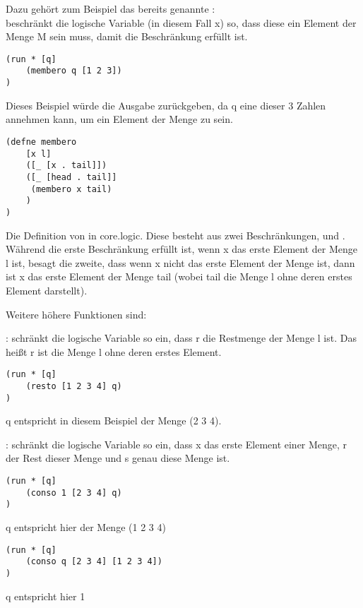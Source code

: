 Dazu gehört zum Beispiel das bereits genannte :\\
 beschränkt die logische Variable (in diesem Fall x) so, dass diese ein Element der Menge M sein muss, damit die Beschränkung erfüllt ist.\\
\begin{lstlisting}
(run * [q]
	(membero q [1 2 3])
)
\end{lstlisting}
Dieses Beispiel würde die Ausgabe  zurückgeben, da q eine dieser 3 Zahlen annehmen kann, um ein Element der Menge \code{[1 2 3]} zu sein.

\begin{lstlisting}
(defne membero
	[x l]
	([_ [x . tail]])
	([_ [head . tail]]
	 (membero x tail)
	)
)
\end{lstlisting}
Die Definition von  in core.logic. Diese besteht aus zwei Beschränkungen, \code{([\_ [x . tail]])} und . Während die erste Beschränkung erfüllt ist, wenn x das erste Element der Menge l ist, besagt die zweite, dass wenn x nicht das erste Element der Menge ist, dann ist x das erste Element der Menge tail (wobei tail die Menge l ohne deren erstes Element darstellt).

Weitere höhere Funktionen sind:
\begin{description}
\item{:}
 schränkt die logische Variable so ein, dass r die Restmenge der Menge l ist. Das heißt r ist die Menge l ohne deren erstes Element.
\begin{lstlisting}
(run * [q]
	(resto [1 2 3 4] q)
)
\end{lstlisting}
q entspricht in diesem Beispiel der Menge (2 3 4).
\item{:}
 schränkt die logische Variable so ein, dass x das erste Element einer Menge, r der Rest dieser Menge und s genau diese Menge ist.

\begin{lstlisting}
(run * [q]
	(conso 1 [2 3 4] q)
)
\end{lstlisting}
q entspricht hier der Menge (1 2 3 4)

\begin{lstlisting}
(run * [q]
	(conso q [2 3 4] [1 2 3 4])
)
\end{lstlisting}
q entspricht hier 1
\end{description}

